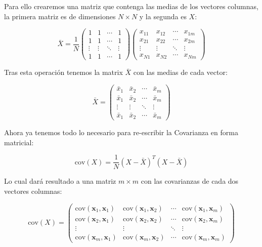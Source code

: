 \documentclass[  DIV=calc,%
paper=a4,%
fontsize=11pt]{scrartcl}             %
\begin{document}
\begin{enumerate}
    Para ello crearemos una matriz que contenga las medias de los vectores columnas, la primera matriz es de dimensiones $N\times N$ y la segunda es $X$:

    \[
    \bar{X} =
    \frac{1}{N}
    \begin{pmatrix}
      1   & 1   & \cdots & 1 \\
      1   & 1   & \cdots & 1 \\
      \vdots              & \vdots  & \ddots & \vdots \\
      1   & 1   & \cdots & 1
    \end{pmatrix}
    \begin{pmatrix}
      x_{11} & x_{12} & \cdots & x_{1m} \\
      x_{21} & x_{22} & \cdots & x_{2m} \\
      \vdots          & \vdots & \ddots & \vdots \\
      x_{N1} & x_{N2} & \cdots & x_{Nm}
    \end{pmatrix}
    \]

    Tras esta operación tenemos la matrix $\bar{X}$ con las medias de cada vector:

    \[
    \bar{X}=
    \begin{pmatrix}
      \bar{x}_1   & \bar{x}_2   & \cdots & \bar{x}_m \\
      \bar{x}_1   & \bar{x}_2   & \cdots & \bar{x}_m \\
      \vdots              & \vdots        & \ddots & \vdots \\
      \bar{x}_1   & \bar{x}_2   & \cdots & \bar{x}_m
    \end{pmatrix}
    \]

    Ahora ya tenemos todo lo necesario para re-escribir la Covarianza en forma matricial:

    \[
    \mathrm{cov}(X) = \frac{1}{N}\left( X - \bar{X} \right)^T\left( X - \bar{X} \right)
    \]

    Lo cual dará resultado a una matriz $m\times m$ con las covarianzas de cada dos vectores columnas:

    \[
    \mathrm{cov}(X) =
    \begin{pmatrix}
      \mathrm{cov}(\mathbf{x}_1, \mathbf{x}_1)   & \mathrm{cov}(\mathbf{x}_1, \mathbf{x}_2)  & \cdots   &  \mathrm{cov}(\mathbf{x}_1, \mathbf{x}_m)  \\
      \mathrm{cov}(\mathbf{x}_2, \mathbf{x}_1)  & \mathrm{cov}(\mathbf{x}_2, \mathbf{x}_2)  & \cdots   &  \mathrm{cov}(\mathbf{x}_2, \mathbf{x}_m) \\
      \vdots                                    & \vdots                                      & \ddots   &   \vdots                                   \\
      \mathrm{cov}(\mathbf{x}_m, \mathbf{x}_1)   & \mathrm{cov}(\mathbf{x}_m, \mathbf{x}_2)  & \cdots   & \mathrm{cov}(\mathbf{x}_m, \mathbf{x}_m)
    \end{pmatrix}
    \]


\end{enumerate}
\end{document}
